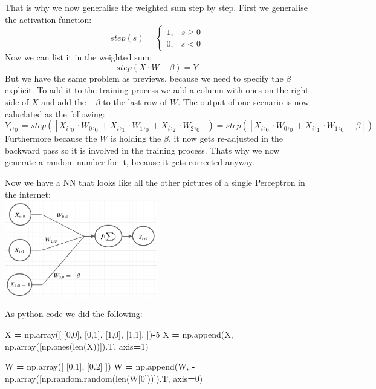 \documentclass[
]{book}
\newenvironment{Shaded}{\begin{snugshade}}{\end{snugshade}}
\newcommand{\BuiltInTok}[1]{#1}
\newcommand{\DecValTok}[1]{\textcolor[rgb]{0.00,0.00,0.81}{#1}}
\newcommand{\FloatTok}[1]{\textcolor[rgb]{0.00,0.00,0.81}{#1}}
\newcommand{\NormalTok}[1]{#1}
\newcommand{\OperatorTok}[1]{\textcolor[rgb]{0.81,0.36,0.00}{\textbf{#1}}}
\begin{document}
That is why we now generalise the weighted sum step by step. First we generalise the activation function:
\[ 
step(s)= 
\begin{cases}
    1,& s   \geq 0\\
    0,& s < 0
\end{cases}
\]
Now we can list it in the weighted sum:
\[
  step(X \cdot W - \beta) = Y
\]
But we have the same problem as previews, because we need to specify the \(\beta\) explicit. To add it to the training process we add a column with ones on the right side of \(X\) and add the \(-\beta\) to the last row of \(W\). The output of one scenario is now caluclated as the following:
\[
  Y_i,_0 = step([X_i,_0 \cdot W_0,_0 + X_i,_1 \cdot W_1,_0 + X_i,_2 \cdot W_2,_0]) = step([X_i,_0 \cdot W_0,_0 + X_i,_1 \cdot W_1,_0 - \beta])
\]
Furthermore because the \(W\) is holding the \(\beta\), it now gets re-adjusted in the backward pass so it is involved in the training process. Thats why we now generate a random number for it, because it gets corrected anyway.

Now we have a NN that looks like all the other pictures of a single Perceptron in the internet:\\
\includegraphics[width=0.5\textwidth,height=\textheight]{./img/NN_02.png}

As python code we did the following:

\begin{Shaded}
\begin{Highlighting}[]
\NormalTok{X }\OperatorTok{=}\NormalTok{ np.array([}
\NormalTok{  [}\DecValTok{0}\NormalTok{,}\DecValTok{0}\NormalTok{],}
\NormalTok{  [}\DecValTok{0}\NormalTok{,}\DecValTok{1}\NormalTok{],}
\NormalTok{  [}\DecValTok{1}\NormalTok{,}\DecValTok{0}\NormalTok{],}
\NormalTok{  [}\DecValTok{1}\NormalTok{,}\DecValTok{1}\NormalTok{],}
\NormalTok{])}\OperatorTok{{-}}\DecValTok{5}
\NormalTok{X }\OperatorTok{=}\NormalTok{ np.append(X, np.array([np.ones(}\BuiltInTok{len}\NormalTok{(X))]).T, axis}\OperatorTok{=}\DecValTok{1}\NormalTok{)}

\NormalTok{W }\OperatorTok{=}\NormalTok{ np.array([}
\NormalTok{  [}\FloatTok{0.1}\NormalTok{], }
\NormalTok{  [}\FloatTok{0.2}\NormalTok{]}
\NormalTok{])}
\NormalTok{W }\OperatorTok{=}\NormalTok{ np.append(W, }\OperatorTok{{-}}\NormalTok{np.array([np.random.random(}\BuiltInTok{len}\NormalTok{(W[}\DecValTok{0}\NormalTok{]))]).T, axis}\OperatorTok{=}\DecValTok{0}\NormalTok{)}
\end{Highlighting}
\end{Shaded}
\end{document}
